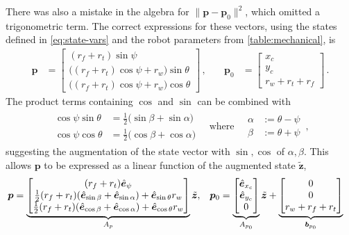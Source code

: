 \documentclass[main.tex]{subfiles}
\begin{document}
	There was also a mistake in the algebra for $\|\bm{p} - \bm p_0\|^2$, which omitted a trigonometric term.
	The correct expressions for these vectors, using the states defined in \cref{eq:state-vars} and the robot parameters from \cref{table:mechanical}, is
	\begin{align}
			\bm{p} &= \begin{bmatrix}
				(r_f + r_t) \sin \psi \\
				\big((r_f + r_t) \cos \psi + r_w\big) \sin\theta \\
				\big((r_f + r_t) \cos \psi + r_w\big) \cos\theta
			\end{bmatrix}\,,
		\quad&
			\bm{p}_0 &= \begin{bmatrix}
				x_c \\
				y_c \\
				r_w + r_t + r_f
			\end{bmatrix}\,.
	\end{align}
	The product terms containing $\cos$ and $\sin$ can be combined with
	\begin{align}
		\begin{aligned}
			\cos \psi \sin\theta &= \tfrac{1}{2} \big(
				\sin \beta + \sin \alpha
			\big) \\
			\cos \psi \cos\theta &= \tfrac{1}{2} \big(
				\cos \beta + \cos \alpha
			\big)
		\end{aligned}
		\quad\text{where}\quad
		\begin{aligned}
		\alpha &:= \theta - \psi \\
		\beta &:= \theta + \psi
		\end{aligned}\,,
	\end{align}
	suggesting the augmentation of the state vector with $\sin, \cos$ of $\alpha, \beta$.
	This allows $\bm{p}$ to be expressed as a linear function of the augmented state $\tilde{\bm{z}}$,
	\begin{align}
		\bm{p} &= \underbrace{\begin{bmatrix}
			(r_f + r_t) \hat{\bm{e}}_{\psi} \\
			\tfrac{1}{2} (r_f + r_t) (\hat{\bm{e}}_{\sin \beta} + \hat{\bm{e}}_{\sin \alpha}) +
			 \hat{\bm{e}}_{\sin \theta} r_w \\
			\tfrac{1}{2} (r_f + r_t) (\hat{\bm{e}}_{\cos \beta} + \hat{\bm{e}}_{\cos \alpha}) +
			 \hat{\bm{e}}_{\cos \theta} r_w
		\end{bmatrix}}_{A_p} \tilde{\bm{z}}, &
		\bm{p}_0 &= \underbrace{\begin{bmatrix}
			\hat{\bm{e}}_{x_c} \\
			\hat{\bm{e}}_{y_c} \\
			0
		\end{bmatrix}}_{A_{p_0}} \tilde{\bm{z}} +
		\underbrace{\begin{bmatrix} 0 \\ 0 \\ r_w + r_f + r_t \end{bmatrix}}_{\bm{b}_{p_0}}
	\end{align}
\end{document}
